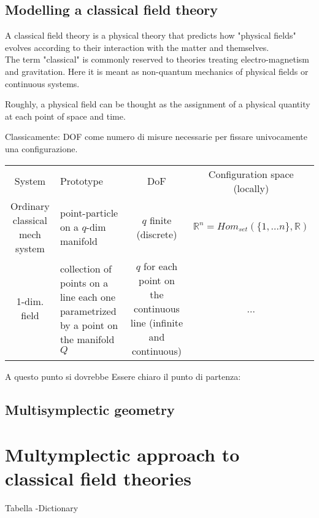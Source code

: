 \subsection{Modelling a classical field theory}
A classical field theory is a physical theory that predicts how "physical fields" evolves according to their interaction with the matter and themselves.
\\
The term "classical" is commonly reserved to theories treating electro-magnetism and gravitation. Here it is meant as non-quantum mechanics of physical fields or continuous systems.

Roughly, a physical field can be thought as the assignment of a physical quantity at each point of space and time.


Classicamente: DOF come numero di misure necessarie per fissare univocamente una configurazione.

\begin{tabularx}{\textwidth}{c X c c}
	System & Prototype & DoF & Configuration space (locally)\\
	Ordinary classical mech system & point-particle on a  $q$-dim manifold &
	$q$ finite (discrete) & $\mathbb{R}^n = Hom_{set}(\{1,\ldots n\}, \mathbb{R})$ \\
	1-dim. field & collection of points on a line each one parametrized by a point on the manifold $Q$ & $q$ for each point on the continuous line (infinite and continuous) &
	...
\end{tabularx}


A questo punto si dovrebbe Essere chiaro il punto di partenza:
\\

\subsection{Multisymplectic geometry}


\section{Multymplectic approach to classical field theories}
Tabella -Dictionary


